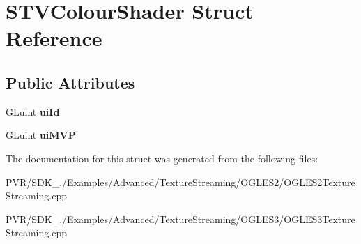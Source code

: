 \hypertarget{struct_s_t_v_colour_shader}{\section{S\+T\+V\+Colour\+Shader Struct Reference}
\label{struct_s_t_v_colour_shader}
}
\subsection*{Public Attributes}
\begin{DoxyCompactItemize}
\item 
\hypertarget{struct_s_t_v_colour_shader_a8b2b07c377f1f89712a3c386b6b1442f}{G\+Luint {\bfseries ui\+Id}}\label{struct_s_t_v_colour_shader_a8b2b07c377f1f89712a3c386b6b1442f}

\item 
\hypertarget{struct_s_t_v_colour_shader_ac2c5b3e0b11fe7846e29e85843a05aac}{G\+Luint {\bfseries ui\+M\+V\+P}}\label{struct_s_t_v_colour_shader_ac2c5b3e0b11fe7846e29e85843a05aac}

\end{DoxyCompactItemize}


The documentation for this struct was generated from the following files\+:\begin{DoxyCompactItemize}
\item 
P\+V\+R/\+S\+D\+K\+\_./\+Examples/\+Advanced/\+Texture\+Streaming/\+O\+G\+L\+E\+S2/O\+G\+L\+E\+S2\+Texture\+Streaming.\+cpp\item 
P\+V\+R/\+S\+D\+K\+\_./\+Examples/\+Advanced/\+Texture\+Streaming/\+O\+G\+L\+E\+S3/O\+G\+L\+E\+S3\+Texture\+Streaming.\+cpp\end{DoxyCompactItemize}
